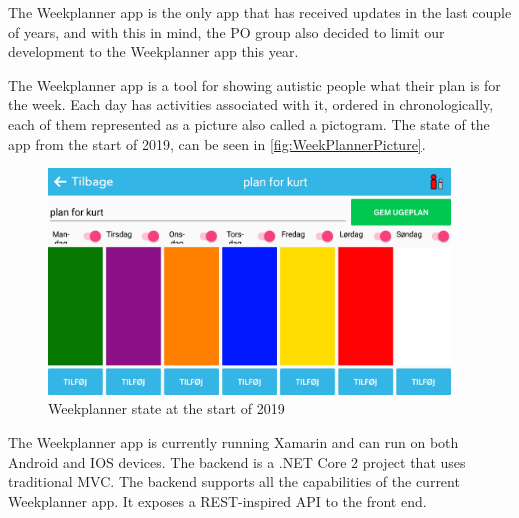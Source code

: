 The Weekplanner app is the only app that has received updates in the last couple of years, and with this in mind, the \gls{PO} group also decided to limit our development to the Weekplanner app this year.

The Weekplanner app is a tool for showing autistic people what their plan is for the week. Each day has activities associated with it, ordered in chronologically, each of them represented as a picture also called a pictogram. The state of the app from the start of 2019, can be seen in \autoref{fig:WeekPlannerPicture}.

\begin{figure}[ht]
        \begin{center}
            \includegraphics[width=0.95\textwidth]{figures/WeekPlannerPicture}
        \end{center}
        \caption{Weekplanner state at the start of 2019}
        \label{fig:WeekPlannerPicture}
\end{figure}

The Weekplanner app is currently running Xamarin and can run on both Android and IOS devices.
The backend is a .NET Core 2 project that uses traditional MVC. The backend supports all the capabilities of the current Weekplanner app. It exposes a REST-inspired API to the front end.
